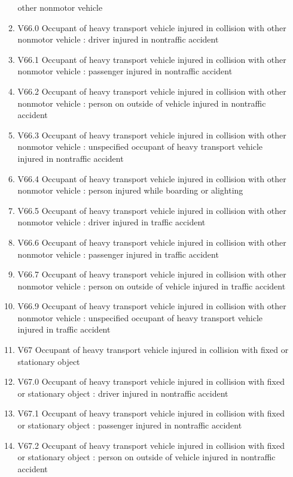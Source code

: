 \documentclass[
]{scrartcl}
\begin{document}
\begin{itemize}
\begin{enumerate}
    other nonmotor vehicle
  \item
    V66.0 Occupant of heavy transport vehicle injured in collision with
    other nonmotor vehicle : driver injured in nontraffic accident
  \item
    V66.1 Occupant of heavy transport vehicle injured in collision with
    other nonmotor vehicle : passenger injured in nontraffic accident
  \item
    V66.2 Occupant of heavy transport vehicle injured in collision with
    other nonmotor vehicle : person on outside of vehicle injured in
    nontraffic accident
  \item
    V66.3 Occupant of heavy transport vehicle injured in collision with
    other nonmotor vehicle : unspecified occupant of heavy transport
    vehicle injured in nontraffic accident
  \item
    V66.4 Occupant of heavy transport vehicle injured in collision with
    other nonmotor vehicle : person injured while boarding or alighting
  \item
    V66.5 Occupant of heavy transport vehicle injured in collision with
    other nonmotor vehicle : driver injured in traffic accident
  \item
    V66.6 Occupant of heavy transport vehicle injured in collision with
    other nonmotor vehicle : passenger injured in traffic accident
  \item
    V66.7 Occupant of heavy transport vehicle injured in collision with
    other nonmotor vehicle : person on outside of vehicle injured in
    traffic accident
  \item
    V66.9 Occupant of heavy transport vehicle injured in collision with
    other nonmotor vehicle : unspecified occupant of heavy transport
    vehicle injured in traffic accident
  \item
    V67 Occupant of heavy transport vehicle injured in collision with
    fixed or stationary object
  \item
    V67.0 Occupant of heavy transport vehicle injured in collision with
    fixed or stationary object : driver injured in nontraffic accident
  \item
    V67.1 Occupant of heavy transport vehicle injured in collision with
    fixed or stationary object : passenger injured in nontraffic
    accident
  \item
    V67.2 Occupant of heavy transport vehicle injured in collision with
    fixed or stationary object : person on outside of vehicle injured in
    nontraffic accident

\end{enumerate}
\end{itemize}
\end{document}
